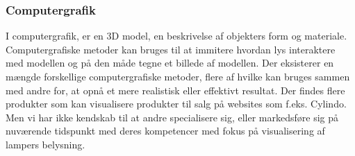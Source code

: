 


\subsubsection{Computergrafik}
\label{sec:computergrafik}
I computergrafik, er en 3D model, en beskrivelse af objekters form og materiale.\cite{computergrafik_introduktion} Computergrafiske metoder kan bruges til at immitere hvordan lys interaktere med modellen og på den måde tegne et billede af modellen. Der eksisterer en mængde forskellige computergrafiske metoder, flere af hvilke kan bruges sammen med andre for, at opnå et mere realistisk eller effektivt resultat. Der findes flere produkter som kan visualisere produkter til salg på websites som f.eks. Cylindo\cite{Cylindo}. Men vi har ikke kendskab til at andre specialisere sig, eller markedsføre sig på nuværende tidspunkt med deres kompetencer med fokus på visualisering af lampers belysning.


